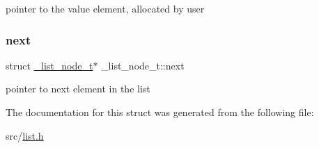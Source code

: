 pointer to the value element, allocated by user 

\hypertarget{struct__list__node__t_a7e892551dbe86f632a09818435bdb459}{}\label{struct__list__node__t_a7e892551dbe86f632a09818435bdb459} 
\subsubsection{\texorpdfstring{next}{next}}
{\footnotesize\ttfamily struct \hyperlink{struct__list__node__t}{\+\_\+list\+\_\+node\+\_\+t}$\ast$ \+\_\+list\+\_\+node\+\_\+t\+::next}



pointer to next element in the list 



The documentation for this struct was generated from the following file\+:\begin{DoxyCompactItemize}
\item 
src/\hyperlink{list_8h}{list.\+h}\end{DoxyCompactItemize}
